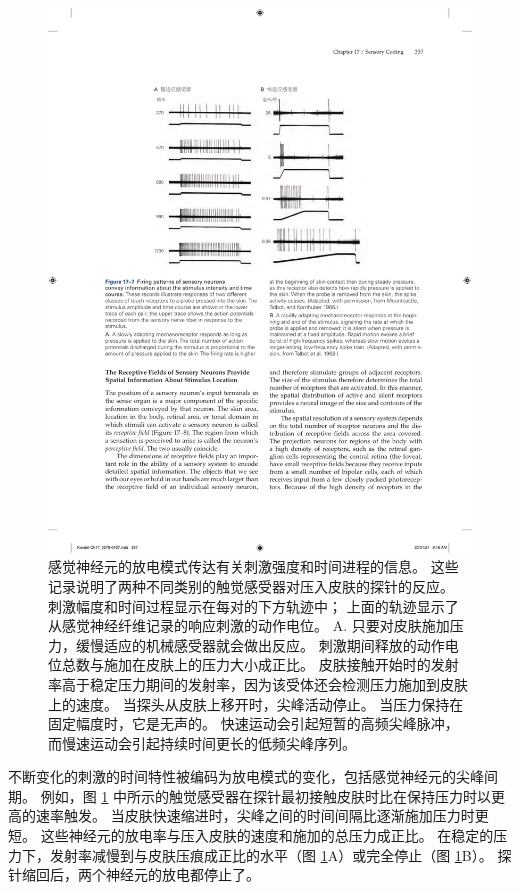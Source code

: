 \begin{figure}[htbp]
	\centering
	\includegraphics[width=1.0\linewidth]{chap17/fig_17_7}
	\caption{感觉神经元的放电模式传达有关刺激强度和时间进程的信息。
		这些记录说明了两种不同类别的触觉感受器对压入皮肤的探针的反应。 
		刺激幅度和时间过程显示在每对的下方轨迹中； 
		上面的轨迹显示了从感觉神经纤维记录的响应刺激的动作电位。 
		A. 只要对皮肤施加压力，缓慢适应的机械感受器就会做出反应。 
		刺激期间释放的动作电位总数与施加在皮肤上的压力大小成正比。 
		皮肤接触开始时的发射率高于稳定压力期间的发射率，因为该受体还会检测压力施加到皮肤上的速度。 
		当探头从皮肤上移开时，尖峰活动停止\cite{mountcastle1966neural}。
		当压力保持在固定幅度时，它是无声的。 
		快速运动会引起短暂的高频尖峰脉冲，而慢速运动会引起持续时间更长的低频尖峰序列\cite{talbot1968sense}。}
	\label{fig:17_7}
\end{figure}

不断变化的刺激的时间特性被编码为放电模式的变化，包括感觉神经元的尖峰间期。 
例如，图 \ref{fig:17_7} 中所示的触觉感受器在探针最初接触皮肤时比在保持压力时以更高的速率触发。 
当皮肤快速缩进时，尖峰之间的时间间隔比逐渐施加压力时更短。 
这些神经元的放电率与压入皮肤的速度和施加的总压力成正比。 
在稳定的压力下，发射率减慢到与皮肤压痕成正比的水平（图 \ref{fig:17_7}A）或完全停止（图 \ref{fig:17_7}B）。 
探针缩回后，两个神经元的放电都停止了。


